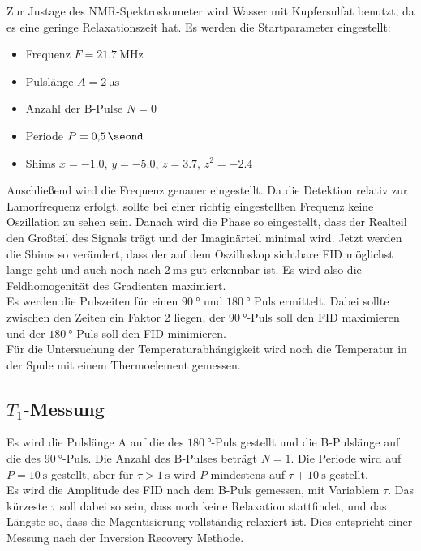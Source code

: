         \noindent Zur Justage des NMR-Spektroskometer wird Wasser mit Kupfersulfat benutzt, da es eine geringe Relaxationszeit hat. Es werden die Startparameter eingestellt: 
        \begin{itemize}
            \item Frequenz $F = \SI{21.7}{\mega\hertz}$
            \item Pulslänge $A = \SI{2}{\micro\second}$
            \item Anzahl der B-Pulse $N = \num{0}$ 
            \item Periode $P = \SI{0.5}{\seond}$ 
            \item Shims $x = \num{-1.0}$, $y = \num{-5.0}$, $z = \num{3.7}$, $z^2 = \num{-2.4}$
        \end{itemize}
        Anschließend wird die Frequenz genauer eingestellt. Da die Detektion relativ zur Lamorfrequenz erfolgt, sollte bei einer richtig eingestellten Frequenz keine Oszillation zu sehen sein. 
        Danach wird die Phase so eingestellt, dass der Realteil den Großteil des Signals trägt und der Imaginärteil minimal wird. Jetzt werden die Shims so verändert, dass der auf dem Oszilloskop 
        sichtbare FID möglichst lange geht und auch noch nach $\SI{2}{\milli\second}$ gut erkennbar ist. Es wird also die Feldhomogenität des Gradienten maximiert. \\
        Es werden die Pulszeiten für einen $\SI{90}{\degree}$ und $\SI{180}{\degree}$ Puls ermittelt. Dabei sollte zwischen den Zeiten ein Faktor 2 liegen, der $\SI{90}{\degree}$-Puls soll den 
        FID maximieren und der $\SI{180}{\degree}$-Puls soll den FID minimieren. \\
        Für die Untersuchung der Temperaturabhängigkeit wird noch die Temperatur in der Spule mit einem Thermoelement gemessen. 
        
    \subsection{$T_1$-Messung}

        \noindent Es wird die Pulslänge A auf die des $\SI{180}{\degree}$-Puls gestellt und die B-Pulslänge auf die des $\SI{90}{\degree}$-Puls. Die Anzahl des B-Pulses beträgt $N = 1$. Die Periode 
        wird auf $ P = \SI{10}{\second}$ gestellt, aber für $\tau > \SI{1}{\second}$ wird $P$ mindestens auf $\tau + \SI{10}{\second}$ gestellt.\\ 
        Es wird die Amplitude des FID nach dem B-Puls gemessen, mit Variablem $\tau$. Das kürzeste $\tau$ soll dabei so sein, dass noch keine Relaxation stattfindet, und das Längste so, dass die Magentisierung 
        vollständig relaxiert ist. Dies entspricht einer Messung nach der Inversion Recovery Methode.

